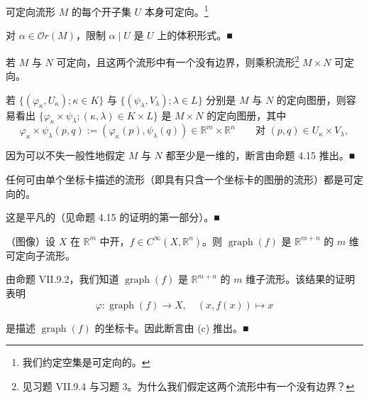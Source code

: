 \begin{example}

\begin{items}
\item

可定向流形 $ M $ 的每个开子集 $ U $ 本身可定向。\footnote{我们约定空集是可定向的。}

\proofhead
对 $ \alpha \in \mathcal{O}r(M) $，限制 $ \alpha \mid U $ 是 $ U $ 上的体积形式。\nobreak\hspace{0.35em}■
\item

若 $ M $ 与 $ N $ 可定向，且这两个流形中有一个没有边界，则乘积流形\footnote{见习题 VII.9.4 与习题 3。为什么我们假定这两个流形中有一个没有边界？} $ M \times N $ 可定向。

\proofhead
若 $ \{ (\varphi_{\kappa}, U_{\kappa}) ; \kappa \in K \} $ 与 $ \{ (\psi_{\lambda}, V_{\lambda}) ; \lambda \in L \} $ 分别是 $ M $ 与 $ N $ 的定向图册，则容易看出 $ \{ \varphi_{\kappa} \times \psi_{\lambda} ; (\kappa, \lambda) \in K \times L \} $ 是 $ M \times N $ 的定向图册，其中
\[
\varphi_{\kappa} \times \psi_{\lambda}(p,q) := (\varphi_{\kappa}(p), \psi_{\lambda}(q)) \in \mathbb{R}^{m} \times \mathbb{R}^{n} \qquad \text{对 } (p,q) \in U_{\kappa} \times V_{\lambda} ,
\]

因为可以不失一般性地假定 $ M $ 与 $ N $ 都至少是一维的，断言由命题 4.15 推出。\nobreak\hspace{0.35em}■

\item

任何可由单个坐标卡描述的流形（即具有只含一个坐标卡的图册的流形）都是可定向的。

\proofhead
这是平凡的（见命题 4.15 的证明的第一部分）。\nobreak\hspace{0.35em}■
\item

（图像）设 $ X $ 在 $ \mathbb{R}^{m} $ 中开，$ f \in C^{\infty}(X, \mathbb{R}^{n}) $。则 $ \operatorname{graph}(f) $ 是 $ \mathbb{R}^{m+n} $ 的 $ m $ 维可定向子流形。

\proofhead
由命题 VII.9.2，我们知道 $ \operatorname{graph}(f) $ 是 $ \mathbb{R}^{m+n} $ 的 $ m $ 维子流形。该结果的证明表明
\[
\varphi: \operatorname{graph}(f) \to X , \quad (x,f(x)) \mapsto x
\]

是描述 $ \operatorname{graph}(f) $ 的坐标卡。因此断言由 (c) 推出。\nobreak\hspace{0.35em}■

\item


\end{items}
\end{example}
